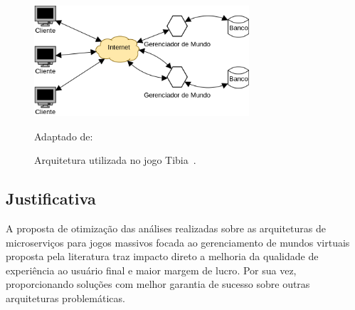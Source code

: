 \begin{figure}[htb!]
  \caption{Arquitetura utilizada no jogo Tibia~\cite{matthiasrudy2011}.}
  \label{fig:rudy}
  \includegraphics[width=8cm]{arquiteturas/rudy.png}
  \centering

  Adaptado de:~\cite{matthiasrudy2011}
\end{figure}

\subsection{Justificativa}

A proposta de otimização das análises realizadas sobre as arquiteturas de microserviços para jogos massivos focada ao gerenciamento de mundos virtuais proposta pela literatura traz impacto direto a melhoria da qualidade de experiência ao usuário final e maior margem de lucro\cite{1417630}.
%
Por sua vez, proporcionando soluções com melhor garantia de sucesso sobre outras arquiteturas problemáticas.

